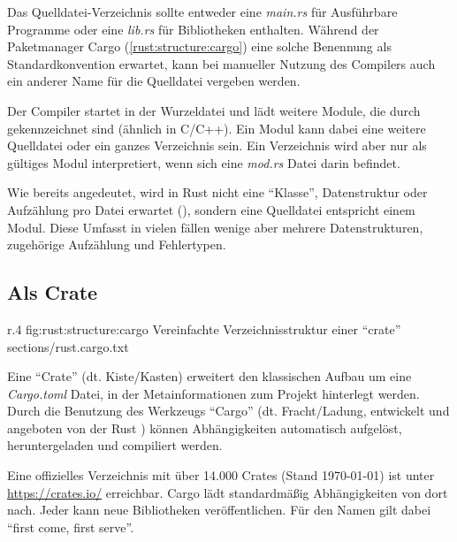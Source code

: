 Das Quelldatei-Verzeichnis sollte entweder eine \textit{main.rs} für Ausführbare Programme oder eine \textit{lib.rs} für Bibliotheken enthalten.
Während der Paketmanager Cargo (\autoref{rust:structure:cargo}) eine solche Benennung als Standardkonvention erwartet, kann bei manueller Nutzung des Compilers auch ein anderer Name für die Quelldatei vergeben werden.

Der Compiler startet in der Wurzeldatei und lädt weitere Module, die durch  gekennzeichnet sind (ähnlich  in C/C++).
Ein Modul kann dabei eine weitere Quelldatei oder ein ganzes Verzeichnis sein.
Ein Verzeichnis wird aber nur als gültiges Modul interpretiert, wenn sich eine \textit{mod.rs} Datei darin befindet.

Wie bereits angedeutet, wird in Rust nicht eine \enquote{Klasse}, Datenstruktur oder Aufzählung pro Datei erwartet (), sondern eine Quelldatei entspricht einem Modul.
Diese Umfasst in vielen fällen wenige aber mehrere Datenstrukturen, zugehörige Aufzählung und Fehlertypen.

\subsection{Als Crate}
\label{rust:structure:cargo}

\begin{wrapfigure}{r}{.4\textwidth}
	\rustcincludeml
		{fig:rust:structure:cargo}
		{Vereinfachte Verzeichnisstruktur einer \enquote{crate}}
		{sections/rust.cargo.txt}
\end{wrapfigure}



Eine \enquote{Crate} (dt. Kiste/Kasten) erweitert den klassischen Aufbau um eine \textit{Cargo.toml} Datei, in der Metainformationen zum Projekt hinterlegt werden.
Durch die Benutzung des Werkzeugs \enquote{Cargo} (dt. Fracht/Ladung, entwickelt und angeboten von der Rust ) können Abhängigkeiten automatisch aufgelöst, heruntergeladen und compiliert werden.

Eine offizielles Verzeichnis mit über 14.000 Crates (Stand \today) ist unter \url{https://crates.io/} erreichbar.
Cargo lädt standardmäßig Abhängigkeiten von dort nach.
Jeder kann neue Bibliotheken veröffentlichen.
Für den Namen gilt dabei \enquote{first come, first serve}.

